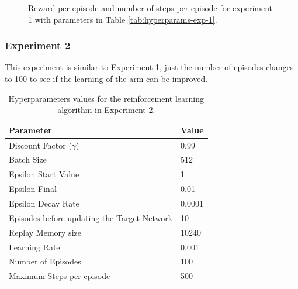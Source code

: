 \documentclass[12pt,oneside]{article}
\begin{document}
\begin{figure}[H]
  \centering
  \hspace{0\textwidth}
  \caption{Reward per episode and number of steps per episode for experiment 1 with parameters in Table \ref{tab:hyperparams-exp-1}.}
  \label{fig:experiment-1}
\end{figure}
\subsubsection{Experiment 2}
This experiment is similar to Experiment 1, just the number of episodes changes to 100 to see if the learning of the arm can be improved.
\begin{table}[H]
\centering
\begin{tabular}{l l}
\hline
Parameter & Value \\
\hline
Discount Factor ($\gamma$) & 0.99 \\
Batch Size & 512 \\
Epsilon Start Value & 1 \\
Epsilon Final & 0.01 \\
Epsilon Decay Rate & 0.0001 \\
Episodes before updating the Target Network & 10 \\
Replay Memory size & 10240 \\
Learning Rate & 0.001 \\
Number of Episodes & 100 \\
Maximum Steps per episode & 500 \\
\hline
\end{tabular}
\caption{Hyperparameters values for the reinforcement learning algorithm in Experiment 2.}
\label{tab:hyperparams-exp-2}
\end{table}
\end{document}
